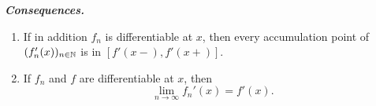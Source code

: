 \documentclass{article}
\begin{document}
\textbf{\textit{Consequences.}}
\begin{enumerate}
\item If in addition $f_n$ is differentiable at $x$, then every accumulation point of $(f_n' (x))_{n \in \mathbb{N}}$ is in $[f' (x-), f' (x+)]$.
\item If $f_n$ and $f$ are differentiable at $x$, then
  \begin{equation}
    \lim_{n \rightarrow \infty} f_n' (x) = f' (x).
  \end{equation}
\end{enumerate}

\printindex
\end{document}
